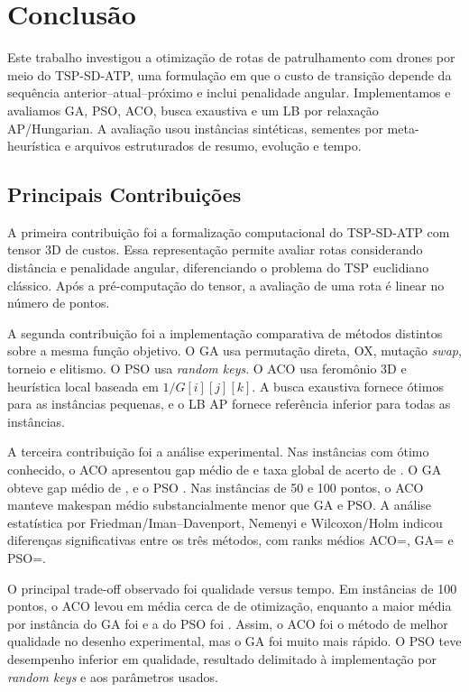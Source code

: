 \chapter[Conclusão]{Conclusão}
\label{conclusao}

Este trabalho investigou a otimização de rotas de patrulhamento com drones por meio do \ac{TSP-SD-ATP}, uma formulação em que o custo de transição depende da sequência anterior--atual--próximo e inclui penalidade angular. Implementamos e avaliamos \ac{GA}, \ac{PSO}, \ac{ACO}, busca exaustiva e um \ac{LB} por relaxação \ac{AP}/Hungarian. A avaliação usou \TotalInstancias{} instâncias sintéticas, \TotalSementesGA{} sementes por meta-heurística e \TotalExecucoes{} arquivos estruturados de resumo, evolução e tempo.

\section{Principais Contribuições}

A primeira contribuição foi a formalização computacional do \ac{TSP-SD-ATP} com tensor 3D de custos. Essa representação permite avaliar rotas considerando distância e penalidade angular, diferenciando o problema do \ac{TSP} euclidiano clássico. Após a pré-computação do tensor, a avaliação de uma rota é linear no número de pontos.

A segunda contribuição foi a implementação comparativa de métodos distintos sobre a mesma função objetivo. O \ac{GA} usa permutação direta, \ac{OX}, mutação \textit{swap}, torneio e elitismo. O \ac{PSO} usa \textit{random keys}. O \ac{ACO} usa feromônio 3D e heurística local baseada em $1/G[i][j][k]$. A busca exaustiva fornece ótimos para as instâncias pequenas, e o \ac{LB} \ac{AP} fornece referência inferior para todas as instâncias.

A terceira contribuição foi a análise experimental. Nas \TotalInstanciasComOtimo{} instâncias com ótimo conhecido, o \ac{ACO} apresentou gap médio de \GapMedioOtimoACO{} e taxa global de acerto de \TaxaAcertoOtimoACO{}. O \ac{GA} obteve gap médio de \GapMedioOtimoGA{}, e o \ac{PSO} \GapMedioOtimoPSO{}. Nas instâncias de 50 e 100 pontos, o \ac{ACO} manteve makespan médio substancialmente menor que \ac{GA} e \ac{PSO}. A análise estatística por Friedman/Iman--Davenport, Nemenyi e Wilcoxon/Holm indicou diferenças significativas entre os três métodos, com ranks médios \ac{ACO}=\RankMedioACO{}, \ac{GA}=\RankMedioGA{} e \ac{PSO}=\RankMedioPSO{}.

O principal trade-off observado foi qualidade versus tempo. Em instâncias de 100 pontos, o \ac{ACO} levou em média cerca de \TempoOtimizacaoACOCemMedioSegundos{} de otimização, enquanto a maior média por instância do \ac{GA} foi \TempoOtimizacaoGAMaxCemMs{} e a do \ac{PSO} foi \TempoOtimizacaoPSOMaxCemMs{}. Assim, o \ac{ACO} foi o método de melhor qualidade no desenho experimental, mas o \ac{GA} foi muito mais rápido. O \ac{PSO} teve desempenho inferior em qualidade, resultado delimitado à implementação por \textit{random keys} e aos parâmetros usados.


